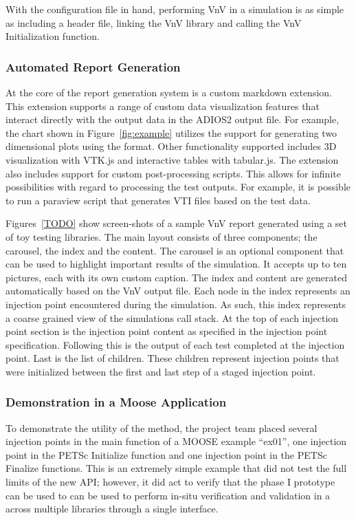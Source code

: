 With the configuration file in hand, performing VnV in a simulation is as simple as including a header file, linking the VnV library and calling the VnV Initialization function. 

\subsubsection{Automated Report Generation}

At the core of the report generation system is a custom markdown extension. This extension supports a range of custom data visualization features that interact directly with the output data in the ADIOS2 output file. For example, the chart shown in  Figure~\ref{fig:example} utilizes the support for generating two dimensional plots using the format. Other functionality supported includes 3D visualization with VTK.js and interactive tables with tabular.js. The extension also includes support for custom post-processing scripts. This allows for infinite possibilities with regard to processing the test outputs. For example, it is possible to  run a paraview script that generates VTI files based on the test data. 

Figures~\ref{TODO} show screen-shots of a sample VnV report generated using a set of toy testing libraries. The main layout consists of three components; the carousel, the index and the content. The carousel is an optional component that can be used to highlight important results of the simulation. It accepts up to ten pictures, each with its own custom caption. The index and content are generated automatically based on the VnV output file. Each node in the index represents an injection point encountered during the simulation. As such, this index represents a coarse grained view of the simulations call stack. At the top of each injection point section is the injection point content as specified in the injection point specification. Following this is the output of each test completed at the injection point. Last is the list of children. These children represent injection points that were initialized between the first and last step of a staged injection point. %

\subsubsection{ Demonstration in a Moose Application } 
To demonstrate the utility of the method, the project team placed several injection points 
in the main function of a MOOSE example ``ex01'', one injection point in the PETSc Initialize function and 
one injection point in the PETSc Finalize functions. This is an extremely simple example that 
did not test the full limits of the new API; however, it did act to verify that the phase I prototype 
can be used to can be used to perform in-situ verification and validation in a across multiple libraries 
through a single interface. 

